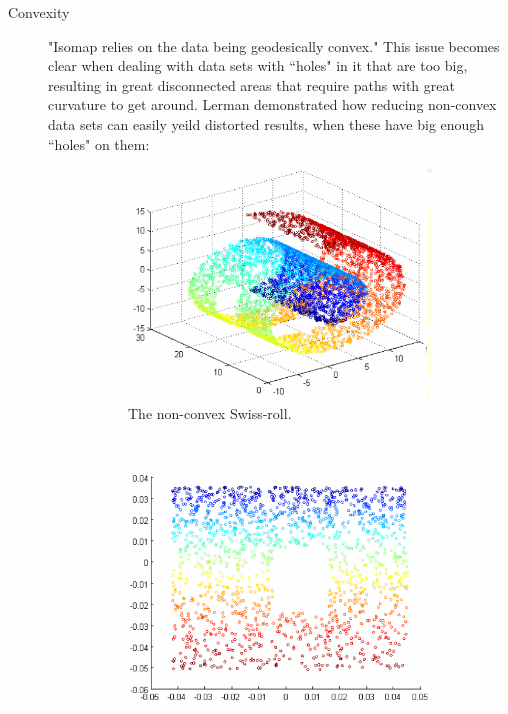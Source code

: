 \documentclass[12pt]{article}
\begin{document}
\begin{description}
	\item[Convexity] "Isomap relies on the data being geodesically convex." \cite{donoho2002does} This issue becomes clear when dealing with data sets with ``holes" in it that are too big, resulting in great disconnected areas that require paths with great curvature to get around. Lerman demonstrated how reducing non-convex data sets can easily yeild distorted results, when these have big enough ``holes" on them: \cite{lerman2005}
		\begin{figure}[H]
		    \centering
			\begin{subfigure}[H]{.3\linewidth}
				\includegraphics[width=\linewidth]{img/convexity/original.png}
				\captionsetup{justification=centering}
				\caption{The non-convex Swiss-roll.}
			\end{subfigure}
			~
			\begin{subfigure}[H]{.3\linewidth}
				\includegraphics[width=\linewidth]{img/convexity/expected.png}

\end{subfigure}
\end{figure}
\end{description}
\end{document}
